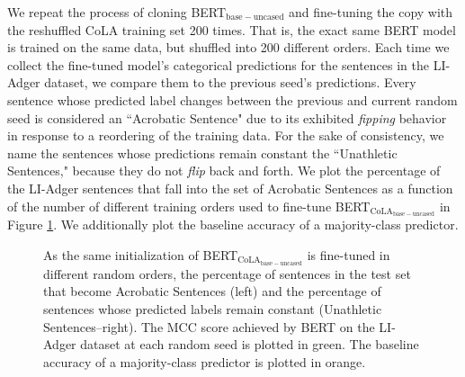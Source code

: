 We repeat the process of cloning BERT$_{\mathrm{base-uncased}}$ and fine-tuning the copy with the reshuffled CoLA training set 200 times.  That is, the exact same BERT model is trained on the same data, but shuffled into 200 different orders.  Each time we collect the fine-tuned model's categorical predictions for the sentences in the LI-Adger dataset, we compare them to the previous seed's predictions.  Every sentence whose predicted label changes between the previous and current random seed is considered an ``Acrobatic Sentence" due to its exhibited \textit{fipping} behavior in response to a reordering of the training data.  For the sake of consistency, we name the sentences whose predictions remain constant the ``Unathletic Sentences," because they do not \textit{flip} back and forth.  We plot the percentage of the LI-Adger sentences that fall into the set of Acrobatic Sentences as a function of the number of different training orders used to fine-tune BERT$_\mathrm{CoLA_{base-uncased}}$ in Figure \ref{fig:bert_stability_testing}.  We additionally plot the baseline accuracy of a majority-class predictor.

\begin{figure}[h]
    \caption[Percentage of Acrobatic Sentences in the LI-Adger test set]{As the same initialization of BERT$_\mathrm{CoLA_{base-uncased}}$ is fine-tuned in different random orders, the percentage of sentences in the test set that become Acrobatic Sentences (left) and the percentage of sentences whose predicted labels remain constant (Unathletic Sentences--right). The MCC score achieved by BERT on the LI-Adger dataset at each random seed is plotted in green.  The baseline accuracy of a majority-class predictor is plotted in orange.}
    \label{fig:bert_stability_testing}
\end{figure}

